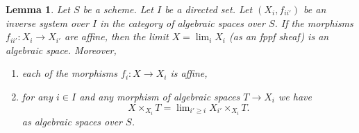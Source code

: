 \documentclass{stacks-project}
\theoremstyle{plain}
\newtheorem{lemma}[subsection]{Lemma}
\theoremstyle{definition}
\theoremstyle{remark}
\numberwithin{equation}{subsection}
\def\lim{\mathop{\mathrm{lim}}\nolimits}
\begin{document}
\begin{lemma}
\label{lemma-directed-inverse-system-has-limit}
Let $S$ be a scheme. Let $I$ be a directed set.
Let $(X_i, f_{ii'})$ be an inverse system over $I$
in the category of algebraic spaces over $S$.
If the morphisms $f_{ii'} : X_i \to X_{i'}$ are affine, then the
limit $X = \lim_i X_i$ (as an fppf sheaf) is an algebraic space.
Moreover,
\begin{enumerate}
\item each of the morphisms $f_i : X \to X_i$ is affine,
\item for any $i \in I$ and any morphism of algebraic spaces
$T \to X_i$ we have
$$
X \times_{X_i} T = \lim_{i' \geq i} X_{i'} \times_{X_i} T.
$$
as algebraic spaces over $S$.
\end{enumerate}
\end{lemma}
\end{document}
